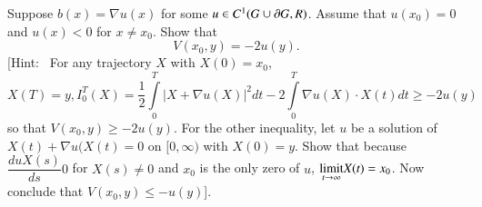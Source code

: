 \begin{exer*}
Suppose $b(x)=\nabla u(x)$ for some $u\in C^{1}(G\cup
\partial G,R)$. Assume that $u(x_{0})=0$ and $u(x)<0$ for $x\neq
x_{0}$. Show that
$$
V(x_{0},y)=-2u(y).
$$
[Hint:~ For any trajectory $X$ with $X(0)=x_{0}$,
$$
X(T)=y, I^{T}_{0}(X)=\frac{1}{2}\int\limits^{T}_{0}|X+\nabla
u(X)|^{2}dt-2\int\limits^{T}_{0}\nabla u(X)\cdot X(t)dt\geq -2u(y) 
$$\pageoriginale
so that $V(x_{0},y)\geq -2u(y)$. For the other inequality, let $u$ be
a solution of $X(t)+\nabla u(X(t)=0$ on $[0,\infty)$ with
  $X(0)=y$. Show that because $\dfrac{duX(s)}{ds}0$ for $X(s)\neq 0$
  and $x_{0}$ is the only zero of $u$,
  $\displaystyle{\mathop{\rm limit}_{t\to \infty}}X(t)=x_{0}$. Now
  conclude that $V(x_{0},y)\leq -u(y)$].
\end{exer*}

